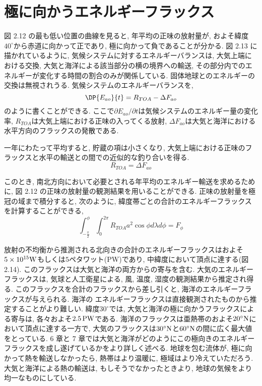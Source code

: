 \documentclass[a4j,12pt,openbib,oneside,dvipdfmx]{jbook}
\begin{document}
\newpage
{}
\section{極に向かうエネルギーフラックス}
図 2.12 の最も低い位置の曲線を見ると, 年平均の正味の放射量が, およそ緯度$40^\circ$から赤道に向かって正であり, 極に向かって負であることが分かる.
図 2.13 に描かれているように, 気候システムに対するエネルギーバランスは, 大気上端における交換, 大気と海洋による該当部分の横の境界への輸送, その部分内でのエネルギーが変化する時間の割合のみが関係している.
固体地球とのエネルギーの交換は無視されうる.
気候システムのエネルギーバランスを,
\begin{equation}
  \DP{E_{ao}}{t}=R_{TOA}-\Delta{F_{ao}}
\end{equation}
のように書くことができる. 
ここで$\partial E_{ao}/\partial t$は気候システムのエネルギー量の変化率, $R_{TOA}$は大気上端における正味の入ってくる放射, $\Delta{F_{ao}}$は大気と海洋における水平方向のフラックスの発散である.
\par
一年にわたって平均すると, 貯蔵の項は小さくなり, 大気上端における正味のフラックスと水平の輸送との間での近似的な釣り合いを得る.
\begin{equation}
  R_{TOA}=\Delta{F_{ao}}
\end{equation}
\par
このとき, 南北方向において必要とされる年平均のエネルギー輸送を求めるために, 図 2.12 の正味の放射量の観測結果を用いることができる. 
正味の放射量を極冠の域まで積分すると, 次のように, 緯度帯ごとの合計のエネルギーフラックスを計算することができる,
\begin{equation}
  \int_{-\frac{\pi}{2}}^\phi \int_0^{2\pi} R_{TOA}a^2\cos{\phi}d{\lambda}d{\phi}=F_{\phi}
\end{equation}
\par
放射の不均衡から推測される北向きの合計のエネルギーフラックスはおよそ$5\times10^{15}\rm{W}$もしくは$5$ペタワット(PW)であり, 中緯度において頂点に達する(図 2.14).
このフラックスは大気と海洋の両方からの寄与を含む.
大気のエネルギーフラックスは, 気球と人工衛星による, 風, 温度, 湿度の観測結果から推定され得る. 
このフラックスを合計のフラックスから差し引くと, 海洋のエネルギーフラックスが与えられる. 
海洋の エネルギーフラックスは直接観測されたものから推定することがより難しい.
緯度$30^\circ$では, 大気と海洋の極に向かうフラックスによる寄与は, 各々およそ$2.5\,\rm{PW}$である.
海洋のフラックスは亜熱帯のおよそ$20^\circ\rm{N}$において頂点に達する一方で, 大気のフラックスは$30^\circ\rm{N}$と$60^\circ\rm{N}$の間に広く最大値をとっている.
6 章と 7 章では大気と海洋がどのようにこの極向きのエネルギーフラックスを成し遂げているかをより詳しく述べる.
地球を包む流体が, 極に向かって熱を輸送しなかったら, 熱帯はより温暖に, 極域はより冷えていただろう.
大気と海洋による熱の輸送は, もしそうでなかったときより, 地球の気候をより均一なものにしている.
\end{document}
